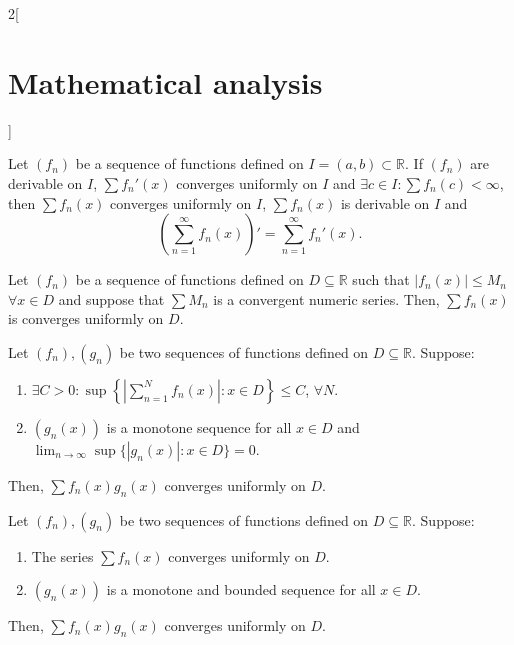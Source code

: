 \documentclass[../../../main.tex]{subfiles}
\begin{document}
\begin{multicols}{2}[\section{Mathematical analysis}]
\begin{theorem}
Let $(f_n)$ be a sequence of functions defined on $I=(a,b)\subset\mathbb{R}$. If $(f_n)$ are derivable on $I$, $\sum f_n'(x)$ converges uniformly on $I$ and $\exists c\in I:\sum f_n(c)<\infty$, then $\sum f_n(x)$ converges uniformly on $I$, $\sum f_n(x)$ is derivable on $I$ and $$\left(\sum_{n=1}^\infty f_n(x)\right)'=\sum_{n=1}^\infty f_n'(x).$$
\end{theorem}
\begin{theorem}
Let $(f_n)$ be a sequence of functions defined on $D\subseteq\mathbb{R}$ such that $|f_n(x)|\leq M_n$ $\forall x\in D$ and suppose that $\sum M_n$ is a convergent numeric series. Then, $\sum f_n(x)$ is converges uniformly on $D$.
\end{theorem}
\begin{theorem}
Let $(f_n),(g_n)$ be two sequences of functions defined on $D\subseteq\mathbb{R}$. Suppose:
\begin{enumerate}
    \item $\displaystyle\exists C>0: \sup\left\{\left|\sum_{n=1}^Nf_n(x)\right|:x\in D\right\}\leq C$, $\forall N$.
    \item $(g_n(x))$ is a monotone sequence for all $x\in D$ and $\displaystyle\lim_{n\to\infty}\sup\{|g_n(x)|:x\in D\}=0$.
\end{enumerate}
Then, $\sum f_n(x)g_n(x)$ converges uniformly on $D$.
\end{theorem}
\begin{theorem}
Let $(f_n),(g_n)$ be two sequences of functions defined on $D\subseteq\mathbb{R}$. Suppose:
\begin{enumerate}
    \item The series $\sum f_n(x)$ converges uniformly on $D$.
    \item $(g_n(x))$ is a monotone and bounded sequence for all $x\in D$.
\end{enumerate}
Then, $\sum f_n(x)g_n(x)$ converges uniformly on $D$.
\end{theorem}

\end{multicols}
\end{document}

